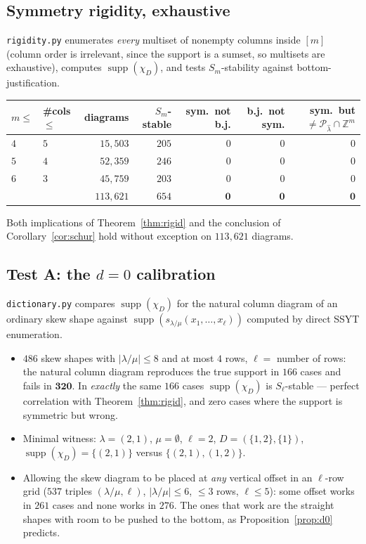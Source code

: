 \documentclass[11pt]{article}
\theoremstyle{definition}
\DeclareMathOperator{\supp}{supp}
\newcommand{\Z}{\mathbb{Z}}
\begin{document}
\subsection{Symmetry rigidity, exhaustive}

\texttt{rigidity.py} enumerates \emph{every} multiset of nonempty columns inside $[m]$ (column
order is irrelevant, since the support is a sumset, so multisets are exhaustive), computes
$\supp(\chi_D)$, and tests $S_m$-stability against bottom-justification.

\begin{center}
\begin{tabular}{llrrrrr}
\toprule
$m\le$ & \#cols $\le$ & diagrams & $S_m$-stable & sym.\ not b.j. & b.j.\ not sym. &
sym.\ but $\ne\mathcal{P}_{\hat\lambda}\cap\Z^m$\\
\midrule
$4$ & $5$ & $15{,}503$ & $205$ & $0$ & $0$ & $0$\\
$5$ & $4$ & $52{,}359$ & $246$ & $0$ & $0$ & $0$\\
$6$ & $3$ & $45{,}759$ & $203$ & $0$ & $0$ & $0$\\
\midrule
 & & $113{,}621$ & $654$ & $\mathbf{0}$ & $\mathbf{0}$ & $\mathbf{0}$\\
\bottomrule
\end{tabular}
\end{center}

Both implications of Theorem~\ref{thm:rigid} and the conclusion of Corollary~\ref{cor:schur}
hold without exception on $113{,}621$ diagrams.

\subsection{Test A: the $d=0$ calibration}

\texttt{dictionary.py} compares $\supp(\chi_D)$ for the natural column diagram of an ordinary
skew shape against $\supp(s_{\lambda/\mu}(x_1,\dots,x_\ell))$ computed by direct SSYT
enumeration.

\begin{itemize}
\item $486$ skew shapes with $|\lambda/\mu|\le8$ and at most $4$ rows, $\ell=$ number of rows:
the natural column diagram reproduces the true support in $166$ cases and fails in $\mathbf{320}$.
In \emph{exactly} the same $166$ cases $\supp(\chi_D)$ is $S_\ell$-stable --- perfect
correlation with Theorem~\ref{thm:rigid}, and zero cases where the support is symmetric but
wrong.
\item Minimal witness: $\lambda=(2,1)$, $\mu=\emptyset$, $\ell=2$, $D=(\{1,2\},\{1\})$,
$\supp(\chi_D)=\{(2,1)\}$ versus $\{(2,1),(1,2)\}$.
\item Allowing the skew diagram to be placed at \emph{any} vertical offset in an $\ell$-row
grid ($537$ triples $(\lambda/\mu,\ell)$, $|\lambda/\mu|\le6$, $\le3$ rows, $\ell\le5$): some
offset works in $261$ cases and none works in $276$. The ones that work are the straight shapes
with room to be pushed to the bottom, as Proposition~\ref{prop:d0} predicts.
\end{itemize}
\end{document}
